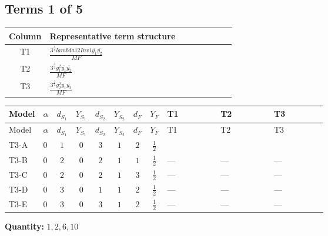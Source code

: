 \documentclass[8pt]{article}
\begin{document}
\begin{landscape}
\subsection*{Terms 1 of 5}
\begin{center}
\begin{tabular}{@{}c >{\raggedright\arraybackslash}p{0.82\linewidth}@{}}
\toprule
Column & Representative term structure \\
\midrule
T1 & \(\displaystyle \frac{3^{\frac{3}{4}} lambda12Inv1 \overline{y_{1}} \overline{y_{2}}}{MF}\) \\
\midrule
T2 & \(\displaystyle \frac{3^{\frac{3}{4}} g_{1}^{2} \overline{y_{1}} \overline{y_{2}}}{MF}\) \\
\midrule
T3 & \(\displaystyle \frac{3^{\frac{3}{4}} g_{2}^{2} \overline{y_{1}} \overline{y_{2}}}{MF}\) \\
\midrule
\bottomrule
\end{tabular}
\end{center}
\smallskip
\tiny
\begin{longtable}{@{}llcccccc >{\raggedright\arraybackslash}p{0.21\linewidth} >{\raggedright\arraybackslash}p{0.21\linewidth} >{\raggedright\arraybackslash}p{0.21\linewidth}@{}}
\toprule
Model & $\alpha$ & $d_{S_1}$ & $Y_{S_1}$ & $d_{S_2}$ & $Y_{S_2}$ & $d_F$ & $Y_F$ & T1 & T2 & T3 \\
\midrule
\endfirsthead
\toprule
Model & $\alpha$ & $d_{S_1}$ & $Y_{S_1}$ & $d_{S_2}$ & $Y_{S_2}$ & $d_F$ & $Y_F$ & T1 & T2 & T3 \\
\midrule
\endhead
T3-A & $0$ & $1$ & $0$ & $3$ & $1$ & $2$ & $\frac{1}{2}$ & \scriptsize\adjustbox{max width=\linewidth}{$\begin{gathered} \frac{3^{\frac{3}{4}} lambda12Inv1 \overline{y_{1}} \overline{y_{2}}}{6 MF}\end{gathered}$} & \scriptsize\adjustbox{max width=\linewidth}{$\begin{gathered} \frac{3^{\frac{3}{4}} g_{1}^{2} \overline{y_{1}} \overline{y_{2}}}{8 MF}\end{gathered}$} & \scriptsize\adjustbox{max width=\linewidth}{$\begin{gathered} \frac{25 \cdot 3^{\frac{3}{4}} g_{2}^{2} \overline{y_{1}} \overline{y_{2}}}{24 MF}\end{gathered}$} \\
\midrule
T3-B & $0$ & $2$ & $0$ & $2$ & $1$ & $1$ & $\frac{1}{2}$ & --- & --- & --- \\
\midrule
T3-C & $0$ & $2$ & $0$ & $2$ & $1$ & $3$ & $\frac{1}{2}$ & --- & --- & --- \\
\midrule
T3-D & $0$ & $3$ & $0$ & $1$ & $1$ & $2$ & $\frac{1}{2}$ & --- & --- & --- \\
\midrule
T3-E & $0$ & $3$ & $0$ & $3$ & $1$ & $2$ & $\frac{1}{2}$ & --- & --- & --- \\
\midrule
\bottomrule
\end{longtable}
\clearpage
\noindent\textbf{Quantity: }$\mathrm{1,2,6,10}$\par\smallskip

\end{landscape}
\end{document}

